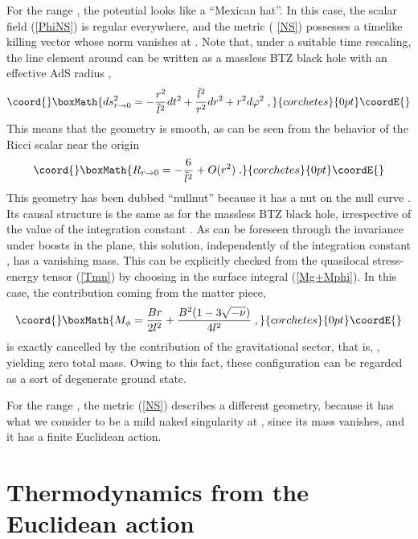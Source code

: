 \documentclass[a4paper,12pt]{article}
\begin{document}
For the range \coordHE{}, the potential looks like a ``Mexican hat''. In this
case, the scalar field (\ref{PhiNS}) is regular everywhere, and the metric (%
\ref{NS}) possesses a timelike killing vector whose norm vanishes at \coordHE{}.
Note that, under a suitable time rescaling, the line element around \coordHE{}
can be written as a massless BTZ black hole with an effective AdS radius \coordHE{}, 
\[\coord{}\boxMath{
ds_{r\rightarrow 0}^{2}=-\frac{r^{2}}{\tilde{l}^{2}}dt^{2}+\frac{\tilde{l}%
^{2}}{r^{2}}dr^{2}+r^{2}d\varphi ^{2}\;,
}{corchetes}{0pt}\coordE{}\]
This means that the geometry is smooth, as can be seen from the behavior of
the Ricci scalar near the origin 
\[\coord{}\boxMath{
R_{r\rightarrow 0}=-\frac{6}{\tilde{l}^{2}}+O(r^{2})\;.
}{corchetes}{0pt}\coordE{}\]
This geometry has been dubbed ``nullnut'' because it has a nut  on the null
curve \coordHE{}. Its causal structure is the same as for the massless BTZ black
hole, irrespective of the value of the integration constant \coordHE{}. As can be
foreseen through the invariance under boosts in the \coordHE{} plane, this
solution, independently of the integration constant \coordHE{}, has a vanishing
mass. This can be explicitly checked from the quasilocal stress-energy
tensor (\ref{Tmn}) by choosing \coordHE{} in the surface integral (\ref{Mg+Mphi}). In this case, the
contribution coming from the matter piece, 
\[\coord{}\boxMath{
M_{\phi }=\frac{Br}{2l^{2}}+\frac{B^{2}(1-3\sqrt{-\nu })}{4l^{2}}\;,
}{corchetes}{0pt}\coordE{}\]
is exactly cancelled by the contribution of the gravitational sector, that
is, \coordHE{}, yielding zero total mass. Owing to this
fact, these configuration can be regarded as a sort of degenerate ground
state.

For the range \coordHE{}, the metric (\ref{NS}) describes a
different geometry, because it has what we consider to be a mild naked
singularity at \coordHE{}, since its mass vanishes, and it has a finite Euclidean
action.

\section{Thermodynamics from the Euclidean action} \label{4}
\end{document}

